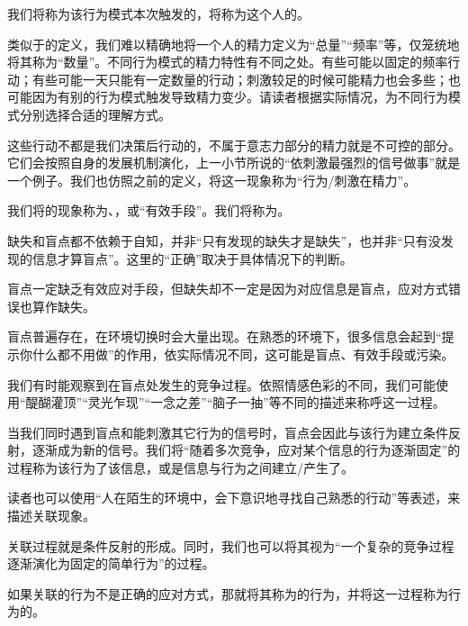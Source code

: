 我们将称为该行为模式本次触发的，将称为这个人的。
\begin{explain}
类似于的定义，我们难以精确地将一个人的精力定义为“总量”“频率”等，仅笼统地将其称为“数量”。不同行为模式的精力特性有不同之处。有些可能以固定的频率行动；有些可能一天只能有一定数量的行动；刺激较足的时候可能精力也会多些；也可能因为有别的行为模式触发导致精力变少。请读者根据实际情况，为不同行为模式分别选择合适的理解方式。

这些行动不都是我们决策后行动的，不属于意志力部分的精力就是不可控的部分。它们会按照自身的发展机制演化，上一小节所说的“依刺激最强烈的信号做事”就是一个例子。我们也仿照之前的定义，将这一现象称为“行为/刺激在精力”。
\end{explain}
我们将的现象称为、，或“有效手段”。我们将称为。
\begin{explain}
缺失和盲点都不依赖于自知，并非“只有发现的缺失才是缺失”，也并非“只有没发现的信息才算盲点”。这里的“正确”取决于具体情况下的判断。

盲点一定缺乏有效应对手段，但缺失却不一定是因为对应信息是盲点，应对方式错误也算作缺失。

盲点普遍存在，在环境切换时会大量出现。在熟悉的环境下，很多信息会起到“提示你什么都不用做”的作用，依实际情况不同，这可能是盲点、有效手段或污染。

我们有时能观察到在盲点处发生的竞争过程。依照情感色彩的不同，我们可能使用“醍醐灌顶”“灵光乍现”“一念之差”“脑子一抽”等不同的描述来称呼这一过程。
\end{explain}
当我们同时遇到盲点和能刺激其它行为的信号时，盲点会因此与该行为建立条件反射，逐渐成为新的信号。我们将“随着多次竞争，应对某个信息的行为逐渐固定”的过程称为该行为了该信息，或是信息与行为之间建立/产生了。
\begin{examples}
读者也可以使用“人在陌生的环境中，会下意识地寻找自己熟悉的行动”等表述，来描述关联现象。

关联过程就是条件反射的形成。同时，我们也可以将其视为“一个复杂的竞争过程逐渐演化为固定的简单行为”的过程。
\end{examples}
如果关联的行为不是正确的应对方式，那就将其称为的行为，并将这一过程称为行为的。
